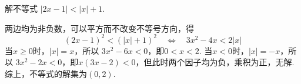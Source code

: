 \begin{problem}
解不等式 \(|2x - 1| < |x| + 1\).

\begin{solution}
两边均为非负数，可以平方而不改变不等号方向，得
\[
(2x-1)^2<(|x|+1)^2
\quad\Longleftrightarrow\quad
3x^2-4x<2|x|
\]
当\(x\geqslant0\)时，\(|x|=x\)，所以
\(3x^2-6x<0\)，即\(0<x<2\).
当\(x<0\)时，\(|x|=-x\)，所以
\(3x^2-2x<0\)，即\(x(3x-2)<0\)，但此时两个因子均为负，乘积为正，无解.
综上，不等式的解集为\((0,2)\).
\end{solution}
\end{problem}
